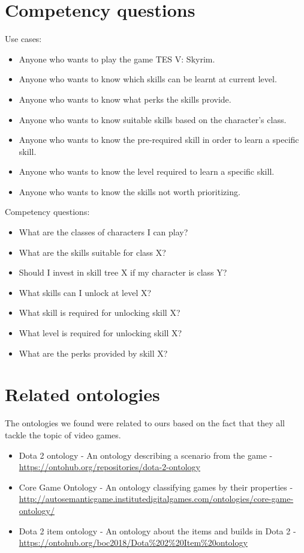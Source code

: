 \documentclass[a4paper,12pt]{report}
\begin{document}
\section{Competency questions}
Use cases:
\begin{itemize}
 \item Anyone who wants to play the game TES V: Skyrim.
 \item Anyone who wants to know which skills can be learnt at current level.
 \item Anyone who wants to know what perks the skills provide.
 \item Anyone who wants to know suitable skills based on the character's class.
 \item Anyone who wants to know the pre-required skill in order to learn a specific skill.
 \item Anyone who wants to know the level required to learn a specific skill.
 \item Anyone who wants to know the skills not worth prioritizing. 
\end{itemize}
\hfill \break
Competency questions:
\begin{itemize}
  \item What are the classes of characters I can play?
  \item What are the skills suitable for class X?
  \item Should I invest in skill tree X if my character is class Y?
  \item What skills can I unlock at level X?
  \item What skill is required for unlocking skill X?
  \item What level is required for unlocking skill X?
  \item What are the perks provided by skill X?
\end{itemize}


\clearpage
\section{Related ontologies}
The ontologies we found were related to ours based on the fact that they all tackle the topic of video games.
\begin{itemize}
    \item Dota 2 ontology - An ontology describing a scenario from the game - \url{https://ontohub.org/repositories/dota-2-ontology}
    \item Core Game Ontology - An ontology classifying games by their properties - \url{http://autosemanticgame.institutedigitalgames.com/ontologies/core-game-ontology/}
    \item Dota 2 item ontology - An ontology about the items and builds in Dota 2 - \url{https://ontohub.org/boc2018/Dota\%202\%20Item\%20ontology}
\end{itemize}
\end{document}
